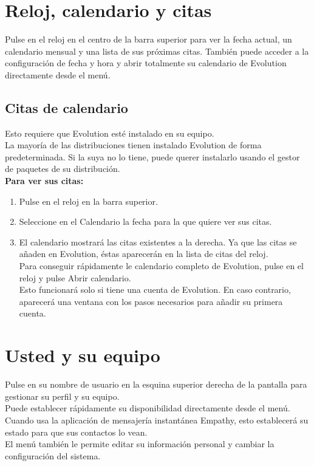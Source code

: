 \section{Reloj, calendario y citas}
Pulse en el reloj en el centro de la barra superior para ver la fecha actual, un calendario mensual y una lista de sus próximas citas. También puede acceder a la configuración de fecha y hora y abrir totalmente su calendario de Evolution directamente desde el menú.
\subsection{Citas de calendario}
Esto requiere que Evolution esté instalado en su equipo.\\
La mayoría de las distribuciones tienen instalado Evolution de forma predeterminada. Si la suya no lo tiene, puede querer instalarlo usando el gestor de paquetes de su distribución.\\

{\bf Para ver sus citas:}
\begin{enumerate}
\item Pulse en el reloj en la barra superior.
\item Seleccione en el Calendario la fecha para la que quiere ver sus citas.
\item El calendario mostrará las citas existentes a la derecha. Ya que las citas se añaden en Evolution, éstas aparecerán en la lista de citas del reloj.\\

Para conseguir rápidamente le calendario completo de Evolution, pulse en el reloj y pulse Abrir calendario.\\
Esto funcionará solo si tiene una cuenta de Evolution. En caso contrario, aparecerá una ventana con los pasos necesarios para añadir su primera cuenta.
\end{enumerate}
\section{Usted y su equipo}
Pulse en su nombre de usuario en la esquina superior derecha de la pantalla para gestionar su perfil y su equipo.\\
Puede establecer rápidamente su disponibilidad directamente desde el menú. Cuando usa la aplicación de mensajería instantánea Empathy, esto establecerá su estado para que sus contactos lo vean.\\

El menú también le permite editar su información personal y cambiar la configuración del sistema.\\

